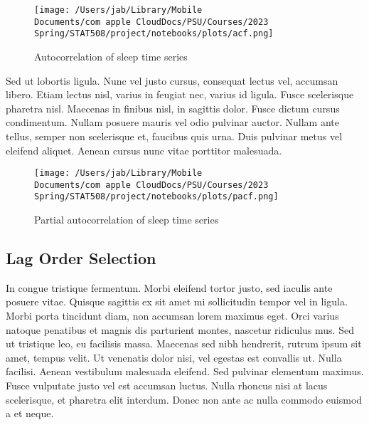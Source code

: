 \documentclass{article}
\begin{document}
\begin{figure}[h]
\centering
  \texttt{[image: /Users/jab/Library/Mobile Documents/com~apple~CloudDocs/PSU/Courses/2023 Spring/STAT508/project/notebooks/plots/acf.png]}
\caption{Autocorrelation of sleep time series}
\end{figure}

Sed ut lobortis ligula. Nunc vel justo cursus, consequat lectus vel,
accumsan libero. Etiam lectus nisl, varius in feugiat nec, varius id
ligula. Fusce scelerisque pharetra nisl. Maecenas in finibus nisl, in
sagittis dolor. Fusce dictum cursus condimentum. Nullam posuere mauris
vel odio pulvinar auctor. Nullam ante tellus, semper non scelerisque et,
faucibus quis urna. Duis pulvinar metus vel eleifend aliquet. Aenean
cursus nunc vitae porttitor malesuada.

\begin{figure}[h]
\centering
  \texttt{[image: /Users/jab/Library/Mobile Documents/com~apple~CloudDocs/PSU/Courses/2023 Spring/STAT508/project/notebooks/plots/pacf.png]}
\caption{Partial autocorrelation of sleep time series}
\end{figure}

\hypertarget{lag-order-selection}{%
\subsection{Lag Order Selection}\label{lag-order-selection}}

In congue tristique fermentum. Morbi eleifend tortor justo, sed iaculis
ante posuere vitae. Quisque sagittis ex sit amet mi sollicitudin tempor
vel in ligula. Morbi porta tincidunt diam, non accumsan lorem maximus
eget. Orci varius natoque penatibus et magnis dis parturient montes,
nascetur ridiculus mus. Sed ut tristique leo, eu facilisis massa.
Maecenas sed nibh hendrerit, rutrum ipsum sit amet, tempus velit. Ut
venenatis dolor nisi, vel egestas est convallis ut. Nulla facilisi.
Aenean vestibulum malesuada eleifend. Sed pulvinar elementum maximus.
Fusce vulputate justo vel est accumsan luctus. Nulla rhoncus nisi at
lacus scelerisque, et pharetra elit interdum. Donec non ante ac nulla
commodo euismod a et neque.
\end{document}
